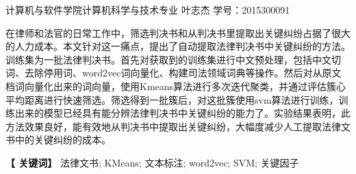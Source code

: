 \newpage


\centerline{\fangsong\bf{}}


\vskip 1cm

\begin{center}
	\kaishu
	\hspace{2cm}计算机与软件学院计算机科学与技术专业 \quad 叶志杰
	\vspace{5bp}
	\newline
	学号：2015300091
\end{center}

\vskip 10bp

{
\kaishu	
{} 
在律师和法官的日常工作中，筛选判决书和从判决书里提取出关键纠纷占据了很大的人力成本。本文针对这一痛点，提出了自动提取法律判决书中关键纠纷的方法。训练集为一批法律判决书。首先对获取到的训练集进行中文预处理，包括中文切词、去除停用词、word2vec词向量化、构建司法领域词典等操作。然后对从原文档词向量化出来的词向量，使用Kmeans算法进行多次迭代聚类，并通过评估簇心平均距离进行快速筛选。筛选得到一批簇后，对这批簇使用svm算法进行训练，训练出来的模型已经具有能分辨法律判决书中关键纠纷的能力了。实验结果表明，此方法效果良好，能有效地从判决书中提取出关键纠纷，大幅度减少人工提取法律文书中的关键纠纷的成本。

\vskip 10bp

\hspace{5bp} {\textbf{【 关键词】}} 
法律文书; KMeans; 文本标注; word2vec; SVM; 关键因子
}